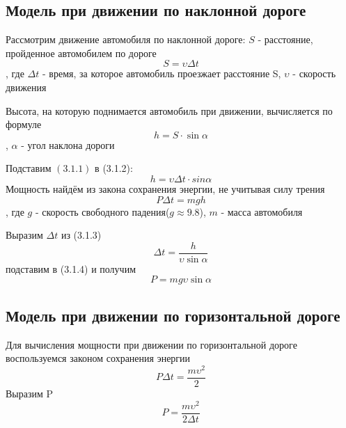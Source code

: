 \documentclass[a4paper, 14pt]{extarticle}
\begin{document}
		\subsection{Модель при движении по наклонной дороге}
			Рассмотрим движение автомобиля по наклонной дороге:
			\( S \) - расстояние, пройденное автомобилем по дороге
			\[ S = \upsilon \Delta t \tag{3.1.1} \label{eq:special} \]
			, где \( \Delta t \) - время, за которое автомобиль проезжает расстояние S,
			\( \upsilon \) - скорость движения
	
			Высота, на которую поднимается автомобиль при движении, вычисляется по формуле
			\[ h = S \cdot \sin{\alpha} \tag{3.1.2} \label{eq:special}\], $\alpha$ - угол наклона дороги
			
			Подставим \( (3.1.1) \) в (3.1.2):
			\[ h = \upsilon \Delta t \cdot sin{\alpha}  \tag{3.1.3} \label{eq:special} \]
			Мощность найдём из закона сохранения энергии, не учитывая силу трения
			\[ P \Delta t = mgh  \tag{3.1.4} \label{eq:special}\]
			, где \( g \) - скорость свободного падения(\( g \approx 9.8 \)), $m$ - масса автомобиля
			
			Выразим \( \Delta t\) из (3.1.3)
			\[ \Delta t = \dfrac{h}{\upsilon \sin{\alpha}} \]
			подставим в (3.1.4) и получим
			\[ P = mg \upsilon \sin{\alpha} \]
		\subsection{Модель при движении по горизонтальной дороге}
			Для вычисления мощности при движении по горизонтальной дороге воспользуемся
			законом сохранения энергии
			\[ P \Delta t = \dfrac{m\upsilon^2}{2} \]
			Выразим P
			\[ P = \dfrac{m\upsilon^2}{2\Delta t} \]
	
\end{document}
